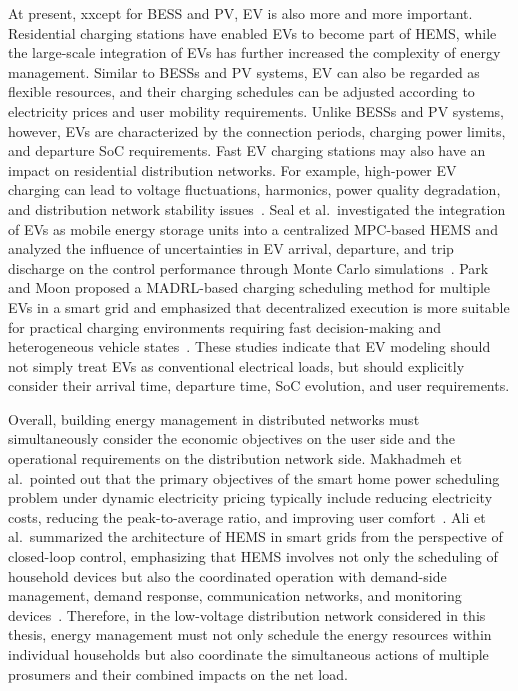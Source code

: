 At present, xxcept for BESS and PV, EV is also more and more important. Residential charging stations have enabled EVs to become part of HEMS, while the large-scale integration of EVs has further increased the complexity of energy management. Similar to BESSs and PV systems, EV can also be regarded as flexible resources, and their charging schedules can be adjusted according to electricity prices and user mobility requirements. Unlike BESSs and PV systems, however, EVs are characterized by the connection periods, charging power limits, and departure SoC requirements. Fast EV charging stations may also have an impact on residential distribution networks. For example, high-power EV charging can lead to voltage fluctuations, harmonics, power quality degradation, and distribution network stability issues~\parencite{9336258}. Seal et al.\ investigated the integration of EVs as mobile energy storage units into a centralized MPC-based HEMS and analyzed the influence of uncertainties in EV arrival, departure, and trip discharge on the control performance through Monte Carlo simulations~\parencite{10012434}. Park and Moon proposed a MADRL-based charging scheduling method for multiple EVs in a smart grid and emphasized that decentralized execution is more suitable for practical charging environments requiring fast decision-making and heterogeneous vehicle states~\parencite{PARK2022120111}. These studies indicate that EV modeling should not simply treat EVs as conventional electrical loads, but should explicitly consider their arrival time, departure time, SoC evolution, and user requirements.

Overall, building energy management in distributed networks must simultaneously consider the economic objectives on the user side and the operational requirements on the distribution network side. Makhadmeh et al.\ pointed out that the primary objectives of the smart home power scheduling problem under dynamic electricity pricing typically include reducing electricity costs, reducing the peak-to-average ratio, and improving user comfort~\parencite{MAKHADMEH2019109362}. Ali et al.\ summarized the architecture of HEMS in smart grids from the perspective of closed-loop control, emphasizing that HEMS involves not only the scheduling of household devices but also the coordinated operation with demand-side management, demand response, communication networks, and monitoring devices~\parencite{ALI2022104609}. Therefore, in the low-voltage distribution network considered in this thesis, energy management must not only schedule the energy resources within individual households but also coordinate the simultaneous actions of multiple prosumers and their combined impacts on the net load.


